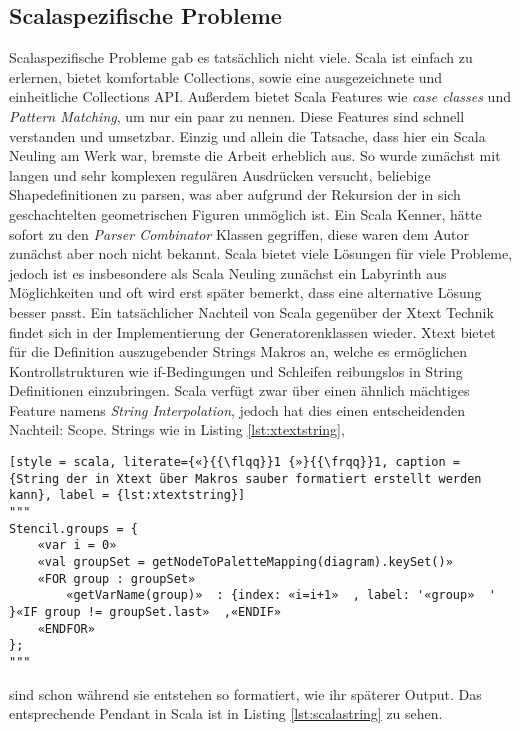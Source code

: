 \subsection{Scalaspezifische Probleme}
Scalaspezifische Probleme gab es tatsächlich nicht viele. Scala ist einfach zu erlernen, bietet komfortable Collections, sowie eine ausgezeichnete und einheitliche Collections API. Außerdem bietet Scala Features wie \textit{case classes} und \textit{Pattern Matching}, um nur ein paar zu nennen. Diese Features sind schnell verstanden und umsetzbar. Einzig und allein die Tatsache, dass hier ein Scala Neuling am Werk war, bremste die Arbeit erheblich aus. So wurde zunächst mit langen und sehr komplexen regulären Ausdrücken versucht, beliebige Shapedefinitionen zu parsen, was aber aufgrund der Rekursion der in sich geschachtelten geometrischen Figuren unmöglich ist. Ein Scala Kenner, hätte sofort zu den \textit{Parser Combinator} Klassen gegriffen, diese waren dem Autor zunächst aber noch nicht bekannt. Scala bietet viele Lösungen für viele Probleme, jedoch ist es insbesondere als Scala Neuling zunächst ein Labyrinth aus Möglichkeiten und oft wird erst später bemerkt, dass eine alternative Lösung besser passt. Ein tatsächlicher Nachteil von Scala gegenüber der Xtext Technik findet sich in der Implementierung der Generatorenklassen wieder. Xtext bietet für die Definition auszugebender Strings Makros an, welche es ermöglichen Kontrollstrukturen wie if-Bedingungen und Schleifen reibungslos in String Definitionen einzubringen. Scala verfügt zwar über einen ähnlich mächtiges Feature namens \textit{String Interpolation}, jedoch hat dies einen entscheidenden Nachteil: Scope. Strings wie in Listing \ref{lst:xtextstring},
\begin{lstlisting}[style = scala, literate={«}{{\flqq}}1 {»}{{\frqq}}1, caption = {String der in Xtext über Makros sauber formatiert erstellt werden kann}, label = {lst:xtextstring}]
"""
Stencil.groups = {
	«var i = 0»  
	«val groupSet = getNodeToPaletteMapping(diagram).keySet()»  
	«FOR group : groupSet»  
		«getVarName(group)»  : {index: «i=i+1»  , label: '«group»  ' }«IF group != groupSet.last»  ,«ENDIF»  
 	«ENDFOR»  
};
"""
\end{lstlisting}
sind schon während sie entstehen so formatiert, wie ihr späterer Output. Das entsprechende Pendant in Scala ist in Listing \ref{lst:scalastring} zu sehen.
